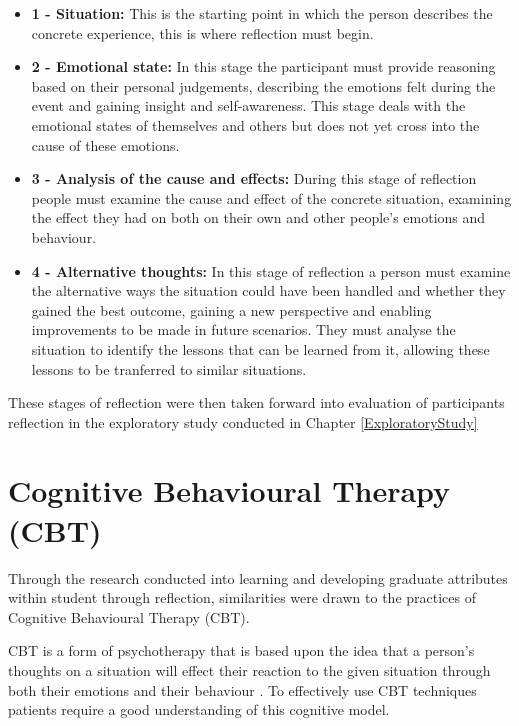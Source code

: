 \documentclass{l4proj}
\begin{document}
\begin{itemize}
    \item \textbf{1 - Situation:} This is the starting point in which the person describes the concrete experience, this is where reflection must begin.
    \item \textbf{2 - Emotional state:} In this stage the participant must provide reasoning based on their personal judgements, describing the emotions felt 
    during the event and gaining insight and self-awareness. This stage deals with the emotional states of themselves and others but does not yet cross 
    into the cause of these emotions.
    \item \textbf{3 - Analysis of the cause and effects:} During this stage of reflection people must examine the cause and effect of the concrete situation,
    examining the effect they had on both on their own and other people's emotions and behaviour.
    \item \textbf{4 - Alternative thoughts:} In this stage of reflection a person must examine the alternative ways the situation could have been handled and
    whether they gained the best outcome, gaining a new perspective and enabling improvements to be made in future scenarios. They must analyse the situation 
    to identify the lessons that can be learned from it, allowing these lessons to be tranferred to similar situations.
\end{itemize}
These stages of reflection were then taken forward into evaluation of participants reflection in the exploratory study conducted in Chapter \ref{ExploratoryStudy}



\section{Cognitive Behavioural Therapy (CBT)}

Through the research conducted into learning and developing graduate attributes within student through reflection, similarities were drawn to the practices of 
Cognitive Behavioural Therapy (CBT). 

CBT is a form of psychotherapy that is based upon the idea that a person's thoughts on a situation will effect their reaction to the given situation 
through both their emotions and their behaviour \citep{whatisCBT_therapistAid}. To effectively use CBT techniques patients require a good understanding
of this cognitive model. 
\end{document}
